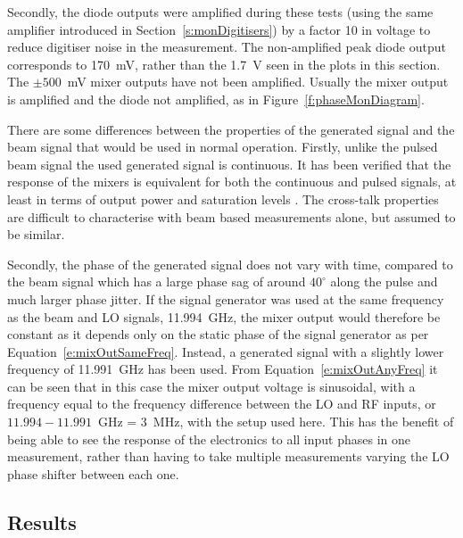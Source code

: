 Secondly, the diode outputs were amplified during these tests (using the same amplifier introduced in Section~\ref{s:monDigitisers}) by a factor 10 in voltage to reduce digitiser noise in the measurement. The non-amplified peak diode output corresponds to 170~mV, rather than the 1.7~V seen in the plots in this section. The \(\pm500\)~mV mixer outputs have not been amplified. Usually the mixer output is amplified and the diode not amplified, as in Figure~\ref{f:phaseMonDiagram}.

There are some differences between the properties of the generated signal and the beam signal that would be used in normal operation. Firstly, unlike the pulsed beam signal the used generated signal is continuous. It has been verified that the response of the mixers is equivalent for both the continuous and pulsed signals, at least in terms of output power and saturation levels \cite{jackFONTOct15}. The cross-talk properties are difficult to characterise with beam based measurements alone, but assumed to be similar.

Secondly, the phase of the generated signal does not vary with time, compared to the beam signal which has a large phase sag of around \(40^\circ\)  along the pulse and much larger phase jitter. If the signal generator was used at the same frequency as the beam and LO signals, 11.994~GHz, the mixer output would therefore be constant as it depends only on the static phase of the signal generator as per Equation~\ref{e:mixOutSameFreq}. Instead, a generated signal with a slightly lower frequency of 11.991~GHz has been used. From Equation~\ref{e:mixOutAnyFreq} it can be seen that in this case the mixer output voltage is sinusoidal, with a frequency equal to the frequency difference between the LO and RF inputs, or \(11.994-11.991\)~GHz = 3~MHz, with the setup used here. This has the benefit of being able to see the response of the electronics to all input phases in one measurement, rather than having to take multiple measurements varying the LO phase shifter between each one.

\subsection{Results}
\label{ss:sigGenResults}

